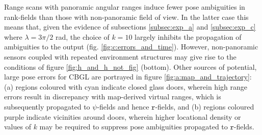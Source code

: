 Range scans with panoramic angular ranges induce fewer pose ambiguities in
rank-fields than those with non-panoramic field of view. In the latter case
this means that, given the evidence of subsections \ref{subsec:exp_a} and
\ref{subsec:exp_c} where $\lambda = 3\pi/2$ rad, the choice of $k=10$ largely
inhibits the propagation of ambiguities to the output (fig.
\ref{fig:c:errors_and_time}).  However, non-panoramic sensors coupled
with repeated environment structures may give rise to the conditions of figure
\ref{fig:h_and_h_not_fig} (bottom). Other sources of potential, large pose
errors for CBGL are portrayed in figure \ref{fig:a:map_and_trajectory}: (a)
regions coloured with cyan indicate closed glass doors, wherein high range
errors result in discrepancy with map-derived virtual ranges, which is
subsequently propagated to $\psi$-fields and hence $\texttt{r}$-fields, and (b)
regions coloured purple indicate vicinities around doors, wherein
higher locational density or values of $k$ may be required to suppress pose
ambiguities propagated to $\texttt{r}$-fields.

